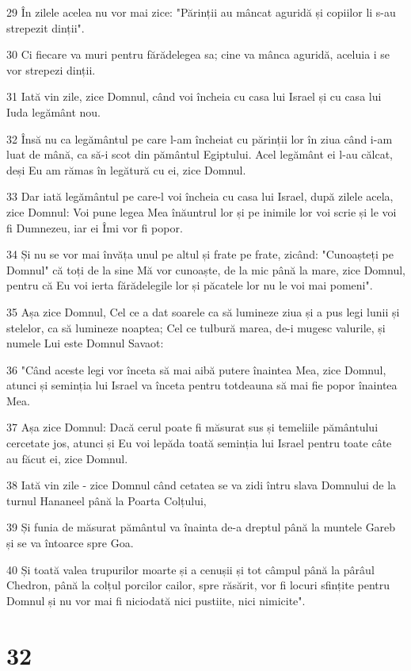 \par 29 În zilele acelea nu vor mai zice: "Părinții au mâncat aguridă și copiilor li s-au strepezit dinții".
\par 30 Ci fiecare va muri pentru fărădelegea sa; cine va mânca aguridă, aceluia i se vor strepezi dinții.
\par 31 Iată vin zile, zice Domnul, când voi încheia cu casa lui Israel și cu casa lui Iuda legământ nou.
\par 32 Însă nu ca legământul pe care l-am încheiat cu părinții lor în ziua când i-am luat de mână, ca să-i scot din pământul Egiptului. Acel legământ ei l-au călcat, deși Eu am rămas în legătură cu ei, zice Domnul.
\par 33 Dar iată legământul pe care-l voi încheia cu casa lui Israel, după zilele acela, zice Domnul: Voi pune legea Mea înăuntrul lor și pe inimile lor voi scrie și le voi fi Dumnezeu, iar ei Îmi vor fi popor.
\par 34 Și nu se vor mai învăța unul pe altul și frate pe frate, zicând: "Cunoașteți pe Domnul" că toți de la sine Mă vor cunoaște, de la mic până la mare, zice Domnul, pentru că Eu voi ierta fărădelegile lor și păcatele lor nu le voi mai pomeni".
\par 35 Așa zice Domnul, Cel ce a dat soarele ca să lumineze ziua și a pus legi lunii și stelelor, ca să lumineze noaptea; Cel ce tulbură marea, de-i mugesc valurile, și numele Lui este Domnul Savaot:
\par 36 "Când aceste legi vor înceta să mai aibă putere înaintea Mea, zice Domnul, atunci și seminția lui Israel va înceta pentru totdeauna să mai fie popor înaintea Mea.
\par 37 Așa zice Domnul: Dacă cerul poate fi măsurat sus și temeliile pământului cercetate jos, atunci și Eu voi lepăda toată seminția lui Israel pentru toate câte au făcut ei, zice Domnul.
\par 38 Iată vin zile - zice Domnul când cetatea se va zidi întru slava Domnului de la turnul Hananeel până la Poarta Colțului,
\par 39 Și funia de măsurat pământul va înainta de-a dreptul până la muntele Gareb și se va întoarce spre Goa.
\par 40 Și toată valea trupurilor moarte și a cenușii și tot câmpul până la pârâul Chedron, până la colțul porcilor cailor, spre răsărit, vor fi locuri sfințite pentru Domnul și nu vor mai fi niciodată nici pustiite, nici nimicite".

\chapter{32}

